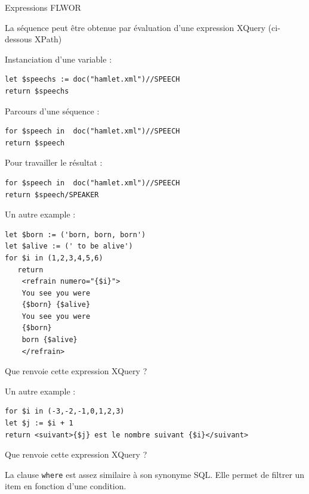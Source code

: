 \begin{frame}{Expressions FLWOR }
\framebreak

La séquence peut être obtenue par évaluation d'une expression XQuery (ci-dessous XPath)

\bigskip

Instanciation d'une variable :
\begin{lstlisting}
let $speechs := doc("hamlet.xml")//SPEECH
return $speechs
\end{lstlisting}

\bigskip

Parcours d'une séquence :
\begin{lstlisting}
for $speech in  doc("hamlet.xml")//SPEECH
return $speech
\end{lstlisting}


\bigskip
Pour travailler le résultat :

\begin{lstlisting}
for $speech in  doc("hamlet.xml")//SPEECH
return $speech/SPEAKER
\end{lstlisting}

\framebreak

Un autre example :

\begin{lstlisting}
let $born := ('born, born, born')
let $alive := (' to be alive')
for $i in (1,2,3,4,5,6)
   return 
	<refrain numero="{$i}">
	You see you were
	{$born} {$alive}
	You see you were
	{$born}
	born {$alive}
	</refrain>
\end{lstlisting}

\begin{exoblock}
Que renvoie cette expression XQuery ?
\end{exoblock}
\framebreak

Un autre example :

\begin{lstlisting}
for $i in (-3,-2,-1,0,1,2,3)
let $j := $i + 1
return <suivant>{$j} est le nombre suivant {$i}</suivant>
\end{lstlisting}

\begin{exoblock}
Que renvoie cette expression XQuery ?
\end{exoblock}


\framebreak

La clause \lstinline!where! est assez similaire à son synonyme SQL. Elle permet de filtrer un item en fonction d'une condition.


\end{frame}
